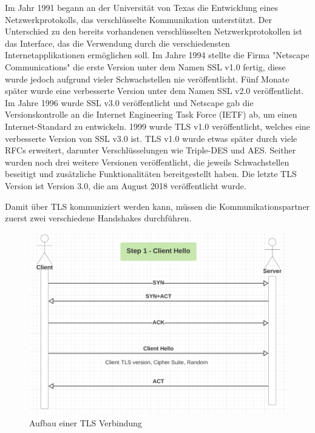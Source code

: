 Im Jahr 1991 begann an der Universität von Texas die Entwicklung eines Netzwerkprotokolls, das verschlüsselte Kommunikation unterstützt. Der Unterschied zu den bereits vorhandenen verschlüsselten Netzwerkprotokollen ist das Interface, das die Verwendung durch die verschiedensten Internetapplikationen ermöglichen soll. Im Jahre 1994 stellte die Firma "Netscape Communications" die erste Version unter dem Namen SSL v1.0 fertig, diese wurde jedoch aufgrund vieler Schwachstellen nie veröffentlicht. Fünf Monate später wurde eine verbesserte Version unter dem Namen SSL v2.0 veröffentlicht. Im Jahre 1996 wurde SSL v3.0 veröffentlicht und Netscape gab die Versionskontrolle an die Internet Engineering Task Force (IETF) ab, um einen Internet-Standard zu entwickeln. 1999 wurde TLS v1.0 veröffentlicht, welches eine verbesserte Version von SSL v3.0 ist. TLS v1.0 wurde etwas später durch viele RFCs erweitert, darunter Verschlüsselungen wie Triple-DES und AES. Seither wurden noch drei weitere Versionen veröffentlicht, die jeweils Schwachstellen beseitigt und zusätzliche Funktionalitäten bereitgestellt haben. Die letzte TLS Version ist Version 3.0, die am August 2018 veröffentlicht wurde. \cite{WikiTLS} 

Damit über TLS kommuniziert werden kann, müssen die Kommunikationspartner zuerst zwei verschiedene Handshakes durchführen. 

\begin{figure}[H]
    \centering
    \includegraphics{media/OpenSSL/VerbindungsAufbau.png}
    \caption{Aufbau einer TLS Verbindung \cite{DeepDiveTLS}}
\end{figure}

